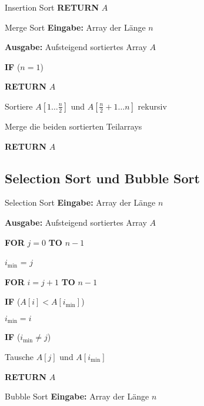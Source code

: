 \documentclass{panikzettel}
\newcommand\tab[1][1cm]{\hspace*{#1}}
\begin{document}
{\begin{halfboxl}
\begin{algo}{Insertion Sort}
		\textbf{RETURN} $A$
	\end{algo}
\end{halfboxl}%
\begin{halfboxr}
	\vspace{-\baselineskip}
	\begin{algo}{Merge Sort}
		\textbf{Eingabe:} Array der Länge $n$
		
		\textbf{Ausgabe:} Aufsteigend sortiertes Array $A$
		\tcblower
		
		\textbf{IF} ($n=1$)
		
		\tab \textbf{RETURN} $A$
		
		Sortiere $A[1 \dots \frac{n}{2}]$ und $A[\frac{n}{2} +1 \dots n]$ rekursiv
		
		Merge die beiden sortierten Teilarrays
		
		\textbf{RETURN} $A$
	\end{algo}
\end{halfboxr}

\subsection{Selection Sort und Bubble Sort}

\begin{halfboxl}
	\vspace{-\baselineskip}
	\begin{algo}{Selection Sort}
		\textbf{Eingabe:} Array der Länge $n$
		
		\textbf{Ausgabe:} Aufsteigend sortiertes Array $A$
		\tcblower
		
		\textbf{FOR} $j=0$ \textbf{TO} $n-1$
		
		\tab $i_{\min}$ = $j$
		
		\tab \textbf{FOR} $i = j + 1 $ \textbf{TO} $n-1$
		
		\tab\tab \textbf{IF} ($A[i] < A[i_{\min}]$)
		
		\tab\tab\tab $i_{\min} = i$
		
		\tab \textbf{IF} ($i_{\min} \neq j$)
		
		\tab\tab Tausche $A[j]$ und $A[i_{\min}]$
		
		\textbf{RETURN} $A$
	\end{algo}
\end{halfboxl}%
\begin{halfboxr}
	\vspace{-\baselineskip}
	\begin{algo}{Bubble Sort}
		\textbf{Eingabe:} Array der Länge $n$
		

\end{algo}
\end{halfboxr}}
\end{document}
